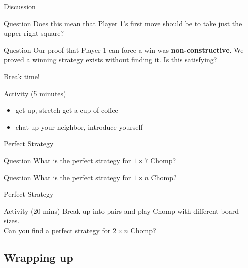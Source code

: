 \documentclass{beamer}
\begin{document}
\begin{frame}{Discussion}
\pause
  \begin{block}{Question}
    Does this mean that {\color{blue}Player 1}'s first move should be to take just the upper right square?
  \end{block}
\pause
  \begin{block}{Question}
    Our proof that {\color{blue}Player 1} can force a win was \textbf{non-constructive}.  We proved a winning strategy exists without finding it.  Is this satisfying?
  \end{block}
\end{frame}

\begin{frame}{Break time!}
  \begin{block}{Activity (5 minutes)}
    \begin{itemize}
      \item get up, stretch get a cup of coffee
      \item chat up your neighbor, introduce yourself
    \end{itemize}
  \end{block}
\end{frame}

\begin{frame}{Perfect Strategy}
\pause
  \begin{block}{Question}
    What is the perfect strategy for $1\times 7$ Chomp?
    \begin{center}
    \end{center}
  \end{block}
\pause
  \begin{block}{Question}
    What is the perfect strategy for $1\times n$ Chomp?
    \begin{center}
    \end{center}
  \end{block}
\end{frame}

\begin{frame}{Perfect Strategy}
\pause
  \begin{block}{Activity (20 mins)}
    Break up into pairs and play Chomp with different board sizes.\\
\pause
    Can you find a perfect strategy for $2\times n$ Chomp?
  \end{block}
\end{frame}

\subsection{Wrapping up}
\end{document}
